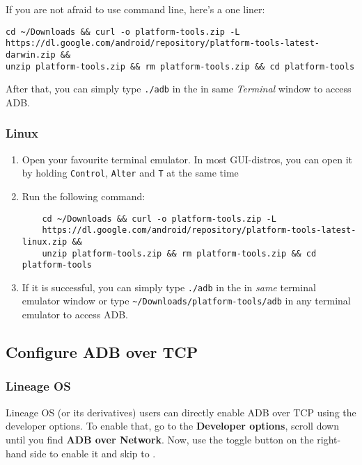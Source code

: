 \begin{tip}[Tip]
    If you are not afraid to use command line, here's a one liner:
    \begin{verbatim}
cd ~/Downloads && curl -o platform-tools.zip -L
https://dl.google.com/android/repository/platform-tools-latest-darwin.zip &&
unzip platform-tools.zip && rm platform-tools.zip && cd platform-tools
    \end{verbatim}
    After that, you can simply type \texttt{./adb} in the in same \textit{Terminal} window to access ADB\@.
\end{tip}

\subsubsection{Linux}
\begin{enumerate}
    \item Open your favourite terminal emulator. In most GUI-distros, you can open it by holding \texttt{Control},
    \texttt{Alter} and \texttt{T} at the same time
    \item Run the following command:
    \begin{verbatim}
    cd ~/Downloads && curl -o platform-tools.zip -L
    https://dl.google.com/android/repository/platform-tools-latest-linux.zip &&
    unzip platform-tools.zip && rm platform-tools.zip && cd platform-tools
    \end{verbatim}
    \item If it is successful, you can simply type \texttt{./adb} in the in \textit{same} terminal emulator window or
    type \texttt{\textasciitilde/Downloads/platform-tools/adb} in any terminal emulator to access ADB\@.
\end{enumerate}

\subsection{Configure ADB over TCP}\label{subsec:configure-adb-over-tcp}

\subsubsection{Lineage OS}\label{subsubsec:lineage-os}
Lineage OS (or its derivatives) users can directly enable ADB over TCP using the developer options. To enable that,
go to the \textbf{Developer options}, scroll down until you find \textbf{ADB over Network}. Now, use the toggle button
on the right-hand side to enable it and skip to .

